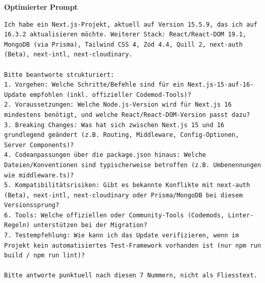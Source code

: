 \documentclass[11pt,a4paper]{article}
\newcommand{\minihead}[1]{\par\needspace{5\baselineskip}\noindent\textbf{#1}\par\nobreak}
\begin{document}
\minihead{Optimierter Prompt}
\begin{lstlisting}
Ich habe ein Next.js-Projekt, aktuell auf Version 15.5.9, das ich auf 16.3.2 aktualisieren möchte. Weiterer Stack: React/React-DOM 19.1, MongoDB (via Prisma), Tailwind CSS 4, Zod 4.4, Quill 2, next-auth (Beta), next-intl, next-cloudinary.

Bitte beantworte strukturiert:
1. Vorgehen: Welche Schritte/Befehle sind für ein Next.js-15-auf-16-Update empfohlen (inkl. offizieller Codemod-Tools)?
2. Voraussetzungen: Welche Node.js-Version wird für Next.js 16 mindestens benötigt, und welche React/React-DOM-Version passt dazu?
3. Breaking Changes: Was hat sich zwischen Next.js 15 und 16 grundlegend geändert (z.B. Routing, Middleware, Config-Optionen, Server Components)?
4. Codeanpassungen über die package.json hinaus: Welche Dateien/Konventionen sind typischerweise betroffen (z.B. Umbenennungen wie middleware.ts)?
5. Kompatibilitätsrisiken: Gibt es bekannte Konflikte mit next-auth (Beta), next-intl, next-cloudinary oder Prisma/MongoDB bei diesem Versionssprung?
6. Tools: Welche offiziellen oder Community-Tools (Codemods, Linter-Regeln) unterstützen bei der Migration?
7. Testempfehlung: Wie kann ich das Update verifizieren, wenn im Projekt kein automatisiertes Test-Framework vorhanden ist (nur npm run build / npm run lint)?

Bitte antworte punktuell nach diesen 7 Nummern, nicht als Fliesstext.
\end{lstlisting}
\end{document}
